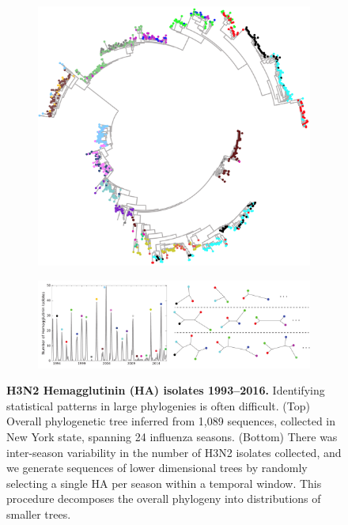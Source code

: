 \documentclass[a4paper,11pt]{article}
\begin{document}
\begin{figure}
    \begin{subfigure}{\linewidth}
    \centering
    \includegraphics[width=0.8\linewidth]{../figures/influenza_HA_tree.png}
    \end{subfigure}
    
    \begin{subfigure}{\linewidth}
    \centering
    \includegraphics[width=\linewidth]{../figures/influenza_seasonal_sampling.pdf}
    \end{subfigure}

    \caption{{\bf H3N2 Hemagglutinin (HA) isolates 1993--2016.} Identifying statistical patterns in large phylogenies is often difficult. (Top) Overall phylogenetic tree inferred from 1,089 sequences, collected in New York state, spanning 24 influenza seasons. (Bottom) There was inter-season variability in the number of H3N2 isolates collected, and we generate sequences of lower dimensional trees by randomly selecting a single HA per season within a temporal window. This procedure decomposes the overall phylogeny into distributions of smaller trees.}
    \label{fig:flu_HA_sampling}
\end{figure}
\end{document}
